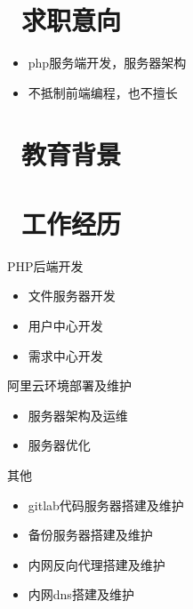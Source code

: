 \documentclass{resume}
\begin{document}



\section{\faInfo\ 求职意向}
\begin{itemize}[parsep=0.5ex]
  \item php服务端开发，服务器架构
  \item 不抵制前端编程，也不擅长
\end{itemize}
 
\section{\faGraduationCap\  教育背景}


\section{\faUsers\ 工作经历}
PHP后端开发
\begin{itemize}
  \item 文件服务器开发
  \item 用户中心开发
  \item 需求中心开发
\end{itemize}
阿里云环境部署及维护
\begin{itemize}
  \item 服务器架构及运维
  \item 服务器优化
\end{itemize}
其他
\begin{itemize}
  \item gitlab代码服务器搭建及维护
  \item 备份服务器搭建及维护
  \item 内网反向代理搭建及维护
  \item 内网dns搭建及维护
\end{itemize}

\end{document}
